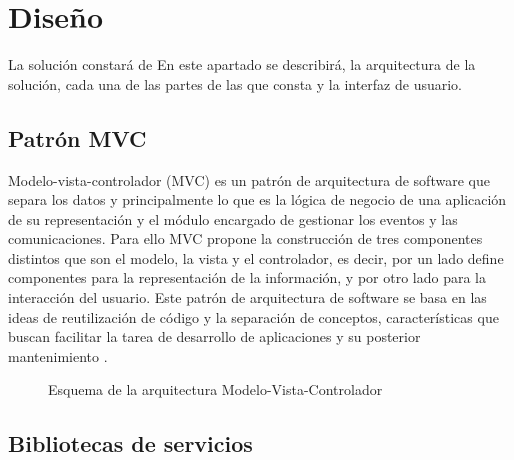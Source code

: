 \chapter{Diseño}

La solución constará de 
En este apartado se describirá, la arquitectura de la solución, cada una de las partes de las que consta y la interfaz de usuario.

\section{Patrón MVC}

Modelo-vista-controlador (MVC) es un patrón de arquitectura de software que separa los datos y principalmente lo que es la lógica de negocio de una aplicación de su representación y el módulo encargado de gestionar los eventos y las comunicaciones. Para ello MVC propone la construcción de tres componentes distintos que son el modelo, la vista y el controlador, es decir, por un lado define componentes para la representación de la información, y por otro lado para la interacción del usuario. Este patrón de arquitectura de software se basa en las ideas de reutilización de código y la separación de conceptos, características que buscan facilitar la tarea de desarrollo de aplicaciones y su posterior mantenimiento \cite{wiki-mvc}.

\begin{figure}[h]
    \centering
    \medskip
    \caption{Esquema de la arquitectura Modelo-Vista-Controlador} 
\end{figure}

\section{Bibliotecas de servicios}

